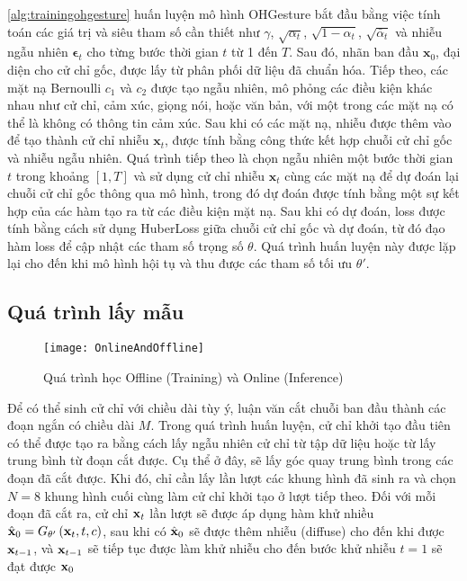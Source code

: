 \autoref{alg:trainingohgesture} huấn luyện mô hình OHGesture bắt đầu bằng việc tính toán các giá trị và siêu tham số cần thiết như $\gamma$, $\sqrt{\alpha_t}$, $\sqrt{1 - \alpha_t}$, $\sqrt{\bar{\alpha}_t}$ và nhiễu ngẫu nhiên $\boldsymbol{\epsilon}_t$ cho từng bước thời gian $t$ từ 1 đến $T$. Sau đó, nhãn ban đầu $\mathbf{x}_0$, đại diện cho cử chỉ gốc, được lấy từ phân phối dữ liệu đã chuẩn hóa. Tiếp theo, các mặt nạ Bernoulli $c_1$ và $c_2$ được tạo ngẫu nhiên, mô phỏng các điều kiện khác nhau như cử chỉ, cảm xúc, giọng nói, hoặc văn bản, với một trong các mặt nạ có thể là không có thông tin cảm xúc. Sau khi có các mặt nạ, nhiễu được thêm vào để tạo thành cử chỉ nhiễu $\mathbf{x}_t$, được tính bằng công thức kết hợp chuỗi cử chỉ gốc và nhiễu ngẫu nhiên. Quá trình tiếp theo là chọn ngẫu nhiên một bước thời gian $t$ trong khoảng $[1, T]$ và sử dụng cử chỉ nhiễu $\mathbf{x}_t$ cùng các mặt nạ để dự đoán lại chuỗi cử chỉ gốc thông qua mô hình, trong đó dự đoán được tính bằng một sự kết hợp của các hàm tạo ra từ các điều kiện mặt nạ. Sau khi có dự đoán, loss được tính bằng cách sử dụng HuberLoss giữa chuỗi cử chỉ gốc và dự đoán, từ đó đạo hàm loss để cập nhật các tham số trọng số $\theta$. Quá trình huấn luyện này được lặp lại cho đến khi mô hình hội tụ và thu được các tham số tối ưu $\theta'$.


\subsection{Quá trình lấy mẫu}

\begin{figure}[H]
	\centering
	\texttt{[image: OnlineAndOffline]}
	\caption{Quá trình học Offline (Training) và Online (Inference)}
	\label{fig:OnlineAndOffline}
\end{figure}

Để có thể sinh cử chỉ với chiều dài tùy ý, luận văn cắt chuỗi ban đầu thành các đoạn ngắn có chiều dài $M$. Trong quá trình huấn luyện, cử chỉ khởi tạo đầu tiên có thể được tạo ra bằng cách lấy ngẫu nhiên cử chỉ từ tập dữ liệu hoặc từ lấy trung bình từ đoạn cắt được. Cụ thể ở đây, sẽ lấy góc quay trung bình trong các đoạn đã cắt được. Khi đó, chỉ cần lấy lần lượt các khung hình đã sinh ra và chọn $N = 8$ khung hình cuối cùng làm cử chỉ khởi tạo ở lượt tiếp theo. Đối với mỗi đoạn đã cắt ra, cử chỉ $\mathbf{x}_{t}$ lần lượt sẽ được áp dụng hàm khử nhiều $\hat{\mathbf{x}}_{0} = G_{\theta'} \left( \mathbf{x}_{t}, t, c\right)$, sau khi có $\hat{\mathbf{x}}_{0}$ sẽ được thêm nhiễu (diffuse) cho đến khi được  $\mathbf{x}_{t-1}$, và $\mathbf{x}_{t-1}$ sẽ tiếp tục được làm khử nhiễu cho đến bước khử nhiễu $t=1$ sẽ đạt được $\mathbf{x}_{0}$ 

